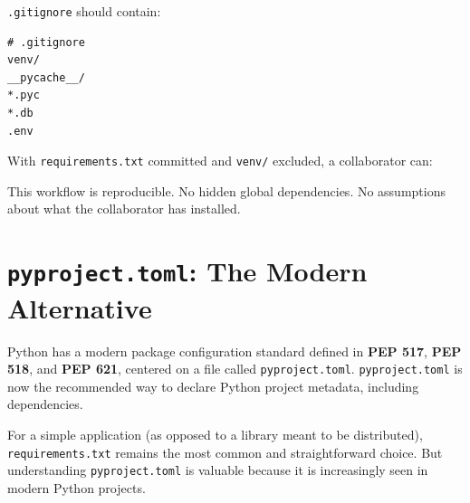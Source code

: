 \noindent{}\texttt{.gitignore} should contain:

\begin{outputbox}[short]
\begin{Verbatim}[fontsize=\codesize, breaklines, breakanywhere, breaksymbolleft={\tiny\textcolor{muted}{$\hookrightarrow$}}]
# .gitignore
venv/
__pycache__/
*.pyc
*.db
.env
\end{Verbatim}
\end{outputbox}

\noindent{}With \texttt{requirements.txt} committed and \texttt{venv/} excluded, a collaborator can:

\begin{codebox}[short]

\begin{Shaded}
\begin{Highlighting}[]
 
\end{Highlighting}
\end{Shaded}

\end{codebox}

\noindent{}This workflow is reproducible. No hidden global dependencies. No assumptions about what the collaborator has installed.

\setcounter{section}{5}
\section{\texorpdfstring{\texttt{pyproject.toml}: The Modern Alternative}{pyproject.toml: The Modern Alternative}}\label{12-dependency-declaration:126-pyprojecttoml-the-modern-alternative}

Python has a modern package configuration standard defined in \textbf{PEP 517}, \textbf{PEP 518}, and \textbf{PEP 621}, centered on a file called \texttt{pyproject.toml}. \texttt{pyproject.toml} is now the recommended way to declare Python project metadata, including dependencies.

For a simple application (as opposed to a library meant to be distributed), \texttt{requirements.txt} remains the most common and straightforward choice. But understanding \texttt{pyproject.toml} is valuable because it is increasingly seen in modern Python projects.

